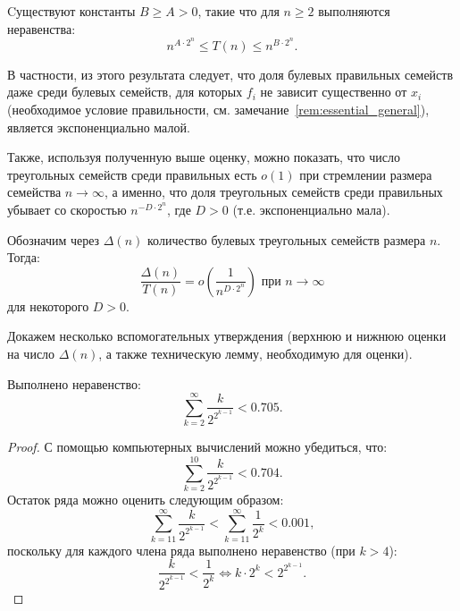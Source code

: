     \begin{proposition}
    \label{thm:num_of_proper}
        Cуществуют константы $B \ge A > 0$, такие что для $n \ge 2$ выполняются неравенства:
        \[ 
            n^{A \cdot 2^n} \le T(n) \le n^{B \cdot 2^n}.
        \]
    \end{proposition}

    В частности, из этого результата следует, что доля булевых правильных семейств даже среди булевых семейств, для которых $f_i$ не зависит существенно от $x_i$ (необходимое условие правильности, см. замечание~\ref{rem:essential_general}), является экспоненциально малой.

    Также, используя полученную выше оценку, можно показать, что число треугольных семейств среди правильных есть $o(1)$ при стремлении размера семейства $n \to \infty$, а именно, что доля треугольных семейств среди правильных убывает со скоростью ${n^{-D \cdot 2^n}}$, где $D > 0$ (т.е. экспоненциально мала).

    \begin{theorem}[{\cite[теорема~6]{dm21}}]
    \label{thm:triangle}
        Обозначим через $\Delta(n)$ количество булевых треугольных семейств размера $n$.
        Тогда:
        \[
            \frac{\Delta(n)}{T(n)} = o \left(\frac{1}{n^{D \cdot 2^n}} \right)
            \text{ при } n \to \infty
        \]
        для некоторого $D > 0$.
    \end{theorem}

    Докажем несколько вспомогательных утверждения (верхнюю и нижнюю оценки на число $\Delta(n)$, а также техническую лемму, необходимую для оценки).

    \begin{lemma}[{\cite[лемма~3]{dm21}}]
    \label{lemma:seriessum}
        Выполнено неравенство:
        \[
            \sum_{k=2}^{\infty} \frac{k}{2^{2^{k-1}}} < 0.705.
        \]
    \end{lemma}

    \begin{proof}
        С помощью компьютерных вычислений можно убедиться, что: 
        \[
            \sum_{k=2}^{10} \frac{k}{2^{2^{k-1}}} < 0.704.
        \]
        Остаток ряда можно оценить следующим образом:
        \[
            \sum_{k=11}^{\infty} \frac{k}{2^{2^{k-1}}} < \sum_{k=11}^{\infty} \frac{1}{2^k} < 0.001,
        \]
        поскольку для каждого члена ряда выполнено неравенство (при $k>4$):
        \[
            \frac{k}{2^{2^{k-1}}} < \frac{1}{2^k} 
            \Leftrightarrow
            k \cdot 2^k < 2^{2^{k-1}}.
        \]
    \end{proof}


